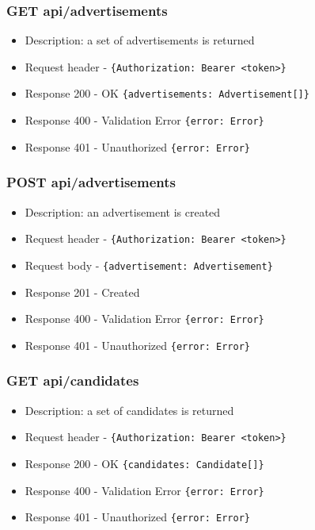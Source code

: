 \subsubsection{GET api/advertisements}
\begin{itemize}
    \item Description: a set of advertisements is returned
    \item Request header - \verb|{Authorization: Bearer <token>}|
    \item Response 200 - OK \verb|{advertisements: Advertisement[]}|
    \item Response 400 - Validation Error \verb|{error: Error}|
    \item Response 401 - Unauthorized \verb|{error: Error}|
\end{itemize}

\subsubsection{POST api/advertisements}
\begin{itemize}
    \item Description: an advertisement is created
    \item Request header - \verb|{Authorization: Bearer <token>}|
    \item Request body - \verb|{advertisement: Advertisement}|
    \item Response 201 - Created
    \item Response 400 - Validation Error \verb|{error: Error}|
    \item Response 401 - Unauthorized \verb|{error: Error}|
\end{itemize}

\subsubsection{GET api/candidates}
\begin{itemize}
    \item Description: a set of candidates is returned
    \item Request header - \verb|{Authorization: Bearer <token>}|
    \item Response 200 - OK \verb|{candidates: Candidate[]}|
    \item Response 400 - Validation Error \verb|{error: Error}|
    \item Response 401 - Unauthorized \verb|{error: Error}|
\end{itemize}

